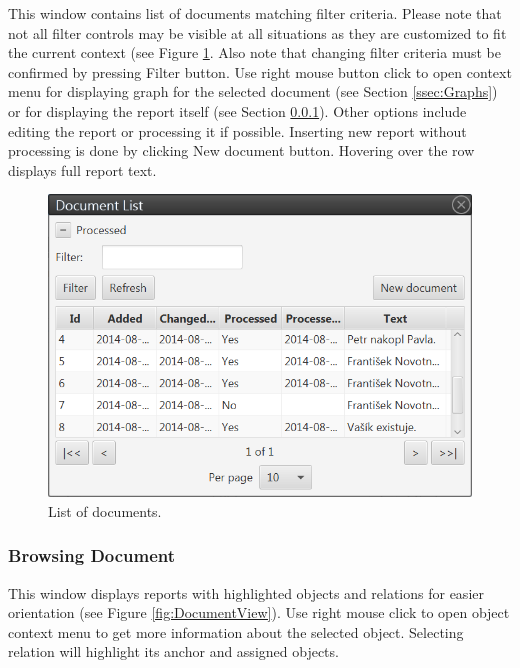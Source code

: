 This window contains list of documents matching filter criteria. Please note
that not all filter controls may be visible at all situations as they are
customized to fit the current context (see Figure \ref{fig:DocumentList}.
Also note that changing filter criteria must be confirmed by pressing Filter
button. Use right mouse button click to open context menu for displaying graph
for the selected document (see Section \ref{ssec:Graphs}) or for displaying the
report itself (see Section \ref{sssec:DocumentView}). Other options include
editing the report or processing it if possible. Inserting new report without processing is done by clicking New document button. Hovering over the row displays full report text.

\begin{figure}[!htb]
        \centering
        \includegraphics[width=\textwidth]{Images/documentlist}
        \caption{List of documents.}
        \label{fig:DocumentList}
\end{figure}

\subsubsection{Browsing Document}
\label{sssec:DocumentView}

This window displays reports with highlighted objects and relations for easier
orientation (see Figure \ref{fig:DocumentView}). Use right mouse click to open
object context menu to get more information about the selected object. Selecting
relation will highlight its anchor and assigned objects.

